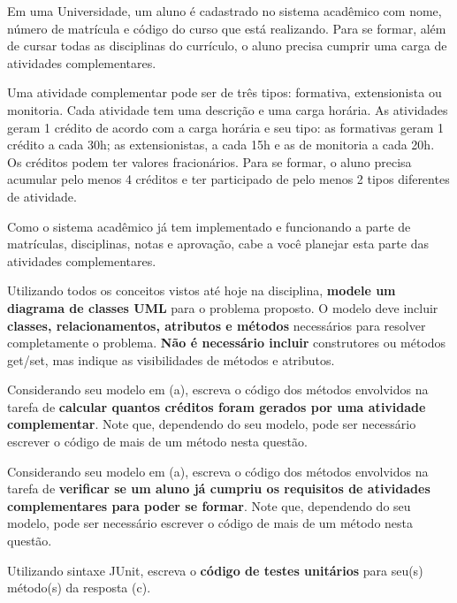 \documentclass{lib/eng_softdoc}
\begin{document}
\makeheader

\problem Em uma Universidade, um aluno é cadastrado no sistema acadêmico com nome, número de matrícula e código do
curso que está realizando. Para se formar, além de cursar todas as disciplinas do currículo, o aluno precisa cumprir uma
carga de atividades complementares.

Uma atividade complementar pode ser de três tipos: formativa, extensionista ou monitoria. Cada atividade tem
uma descrição e uma carga horária. As atividades geram 1 crédito de acordo com a carga horária e seu tipo: as formativas
geram 1 crédito a cada 30h; as extensionistas, a cada 15h e as de monitoria a cada 20h. Os créditos podem ter valores
fracionários. Para se formar, o aluno precisa acumular pelo menos 4 créditos e ter participado de pelo menos 2 tipos
diferentes de atividade.

Como o sistema acadêmico já tem implementado e funcionando a parte de matrículas, disciplinas, notas e
aprovação, cabe a você planejar esta parte das atividades complementares.


\subproblem Utilizando todos os conceitos vistos até hoje na disciplina, \textbf{modele um diagrama de classes UML} para o problema proposto. O modelo deve incluir \textbf{classes, relacionamentos, atributos e métodos} necessários para resolver completamente o problema.
\textbf{Não é necessário incluir} construtores ou métodos get/set, mas indique as visibilidades de métodos e atributos. 

\subproblem Considerando seu modelo em (a), escreva o código dos métodos envolvidos na tarefa de \textbf{calcular quantos créditos foram gerados por uma atividade complementar}. Note que, dependendo do seu modelo, pode ser necessário escrever o código de mais de um método nesta questão.

\subproblem Considerando seu modelo em (a), escreva o código dos métodos envolvidos na tarefa de \textbf{verificar se um aluno já cumpriu os requisitos de atividades complementares para poder se formar}. Note que, dependendo do seu modelo, pode ser necessário escrever o código de mais de um método nesta questão.

\subproblem Utilizando sintaxe JUnit, escreva o \textbf{código de testes unitários} para seu(s) método(s) da resposta (c).
\end{document}
